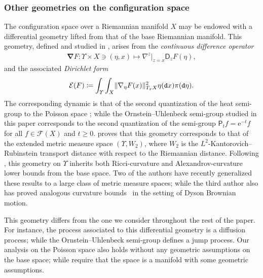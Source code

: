 \documentclass[10pt]{amsart}
\theoremstyle{definition}
\theoremstyle{remark}
\DeclarePairedDelimiter{\norm}{\lVert}{\rVert}
\begin{document}
\subsubsection{Other geometries on the configuration space}
The configuration space over a Riemannian manifold $X$ may be endowed with a differential geometry lifted from that of the base Riemannian manifold.
This geometry, defined and studied in \cite{AKR}, arises from the \emph{continuous difference operator}\vspace*{-3pt}
\begin{align*}
\mathbf{\nabla} F\colon \varUpsilon \times X \ni (\eta,x)\longmapsto \nabla^z\big\vert_{z=x} \mathsf{D}_{z}F(\eta),
\end{align*}
and the associated \emph{Dirichlet form}\vspace*{-3pt}
\begin{equation*}
\mathcal{E}(F) \coloneq \int_{\varUpsilon} \int_{X} \norm{ \mathbf{\nabla}_{\eta}F(x) }_{T_{x}X}^{2} \eta(\mathtt{d} x) \pi(\mathtt{d} \eta).
\end{equation*}
The corresponding dynamic is that of the second quantization of the heat semi-group to the Poisson space \cite{Surgailis}; while the Ornstein--Uhlenbeck semi-group studied in this paper corresponds to the second quantization of the semi-group $\mathsf{P}_{t} f = \mathrm{e}^{-t} f$ for all $f \in \mathscr{F}(X)$ and $t \ge 0$.
\cite{RoecknerSchied} proves that this geometry corresponds to that of the extended metric measure space $(\varUpsilon, W_{2})$, where $W_{2}$ is the $L^2$-Kantorovich--Rubinstein transport distance with respect to the Riemannian distance.
Following \cite{ErbarHuesmann}, this geometry on $\varUpsilon$ inherits both Ricci-curvature and Alexandrov-curvature lower bounds from the base space.
Two of the authors \cite{LzDSSuz21,LzDSSuz22} have recently generalized these results to a large class of metric measure spaces; while the third author also has proved analogous curvature bounds~\cite{Suz22} in the setting of Dyson Brownian motion.

This geometry differs from the one we consider throughout the rest of the paper.
For instance, the process associated to this differential geometry is a diffusion process; while the Ornstein--Uhlenbeck semi-group defines a jump process.
Our analysis on the Poisson space also holds without any geometric assumptions on the base space; while \cite{AKR,ErbarHuesmann} require that the space is a manifold with some geometric assumptions.
\end{document}
